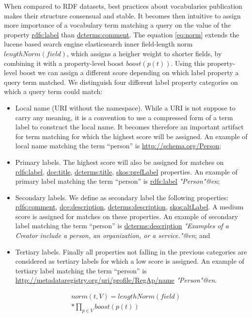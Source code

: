 \documentclass{iosart2c}
\begin{document}
When compared to RDF datasets, best practices about vocabularies publication makes their structure consensual and stable. It becomes then intuitive to assign more importance of a vocabulary term matching a query on the value of the property \url{rdfs:label} than \url{dcterms:comment}. The equation \ref{eq:norm} extends the lucene based search engine elasticsearch inner field-length norm $lengthNorm(field)$, which assigns a heigher weight to shorter fields, by combining it with a property-level boost $boost(p(t))$. Using this property-level boost we can assign a different score depending on which label property a query term matched. We distinguish four different label property categories on which a query term could match: 
		\begin{itemize}
 			\item Local name (URI without the namespace). While a URI is not suppose to carry any meaning, it is a convention to use a compressed form of a term label to construct the local name. It becomes therefore an important artifact for term matching for which the highest score will be assigned. An example of local name matching the term ``person'' is \url{http://schema.org/Person};
			\item Primary labels. The highest score will also be assigned for matches on \url{rdfs:label}, \url{dce:title}, \url{dcterms:title}, \url{skos:prefLabel} properties. An example of primary label matching the term ``person'' is \url{rdfs:label} \emph{"Person"@en};
			\item Secondary labels. We define as secondary label the following properties: \url{rdfs:comment}, \url{dce:description}, \url{dcterms:description}, \url{skos:altLabel}. A medium score is assigned for matches on these properties. An example of secondary label matching the term ``person'' is \url{dcterms:description} \emph{"Examples of a Creator include a person, an organization, or a service."@en}; and
			\item Tertiary labels. Finally all properties not falling in the previous categories are considered as tertiary labels for which a low score is assigned. An example of tertiary label matching the term ``person'' is \url{http://metadataregistry.org/uri/profile/RegAp/name} \emph{"Person"@en}. 
		\end{itemize}

\begin{equation}\label{eq:norm}
\begin{split}
norm(t,V) =  lengthNorm(field) \\
* \prod_{p \in V} boost(p(t))
\end{split}
\end{equation}
\end{document}
